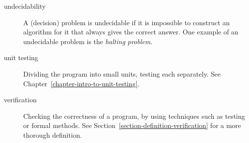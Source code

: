 \documentclass[a4paper,11pt]{kth-mag}
\begin{document}
\begin{description}
  \item[undecidability] A (decision) problem is undecidable if it is impossible
    to construct an algorithm for it that always gives the correct answer. One
    example of an undecidable problem is the \textit{halting problem}.

  \item[unit testing] Dividing the program into small units, testing each
    separately. See Chapter~\ref{chapter-intro-to-unit-testing}.

  \item[verification] Checking the correctness of a program, by using
    techniques such as testing or formal methods. See
    Section~\ref{section-definition-verification} for a more thorough
    definition.
\end{description}
\end{document}
